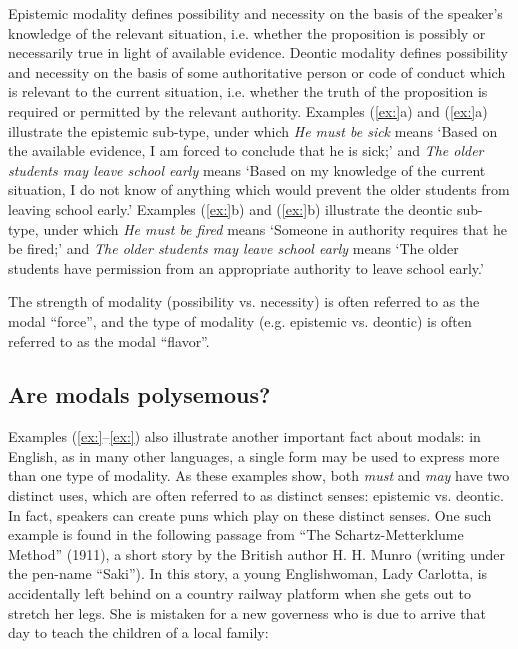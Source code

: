 Epistemic modality defines possibility and necessity on the basis of the speaker’s knowledge of the relevant situation, i.e. whether the proposition is possibly or necessarily true in light of available evidence. Deontic modality defines possibility and necessity on the basis of some authoritative person or code of conduct which is relevant to the current situation, i.e. whether the truth of the proposition is required or permitted by the relevant authority. Examples (\ref{ex:}a) and (\ref{ex:}a) illustrate the epistemic sub-type, under which \textit{He must be sick} means ‘Based on the available evidence, I am forced to conclude that he is sick;’ and \textit{The older students may leave school early} means ‘Based on my knowledge of the current situation, I do not know of anything which would prevent the older students from leaving school early.’ Examples (\ref{ex:}b) and (\ref{ex:}b) illustrate the deontic sub-type, under which \textit{He must be fired} means ‘Someone in authority requires that he be fired;’ and \textit{The older students may leave school early} means ‘The older students have permission from an appropriate authority to leave school early.’



The strength of modality (possibility vs. necessity) is often referred to as the modal “force”, and the type of modality (e.g. epistemic vs. deontic) is often referred to as the modal “flavor”.


\subsection{Are modals polysemous?}\label{sec:} %

Examples (\ref{ex:}--\ref{ex:}) also illustrate another important fact about modals: in English, as in many other languages, a single form may be used to express more than one type of modality. As these examples show, both \textit{must} and \textit{may} have two distinct uses, which are often referred to as distinct senses: epistemic vs. deontic. In fact, speakers can create puns which play on these distinct senses. One such example is found in the following passage from “The Schartz-Metterklume Method” (1911), a short story by the British author H. H. Munro (writing under the pen-name “Saki”). In this story, a young Englishwoman, Lady Carlotta, is accidentally left behind on a country railway platform when she gets out to stretch her legs. She is mistaken for a new governess who is due to arrive that day to teach the children of a local family:


